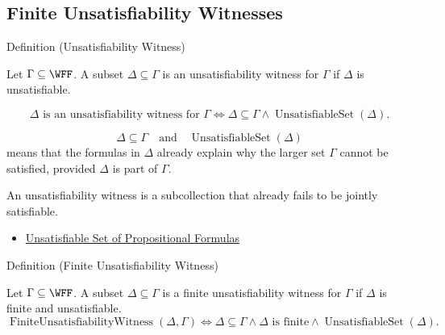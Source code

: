 \subsection*{Finite Unsatisfiability Witnesses}

\begin{definitionbox}{Definition (Unsatisfiability Witness)}
\begin{definition}
\label{def:unsatisfiability-witness-propositional-logic}
Let \(\Gamma\subseteq\WFF\). A subset \(\Delta\subseteq\Gamma\) is an
unsatisfiability witness for \(\Gamma\) if \(\Delta\) is unsatisfiable.
\end{definition}
\end{definitionbox}

\begin{remark*}
\[
\Delta\text{ is an unsatisfiability witness for }\Gamma
\Longleftrightarrow
\Delta\subseteq\Gamma\land \operatorname{UnsatisfiableSet}(\Delta).
\]
\end{remark*}

\begin{remark*}
\[
\Delta\subseteq\Gamma
\quad\text{and}\quad
\operatorname{UnsatisfiableSet}(\Delta)
\]
means that the formulas in \(\Delta\) already explain why the larger set
\(\Gamma\) cannot be satisfied, provided \(\Delta\) is part of \(\Gamma\).
\end{remark*}

\begin{remark*}[Interpretation]
An unsatisfiability witness is a subcollection that already fails to be
jointly satisfiable.
\end{remark*}

\begin{dependencies}
\begin{itemize}
  \item \hyperref[def:unsatisfiable-set-of-propositional-formulas]{Unsatisfiable Set of Propositional Formulas}
\end{itemize}
\end{dependencies}

\begin{definitionbox}{Definition (Finite Unsatisfiability Witness)}
\begin{definition}
\label{def:finite-unsatisfiability-witness-propositional-logic}
Let \(\Gamma\subseteq\WFF\). A subset \(\Delta\subseteq\Gamma\) is a finite
unsatisfiability witness for \(\Gamma\) if \(\Delta\) is finite and
unsatisfiable.
\[
\operatorname{FiniteUnsatisfiabilityWitness}(\Delta,\Gamma)
\Longleftrightarrow
\Delta\subseteq\Gamma\land \Delta\text{ is finite}\land
\operatorname{UnsatisfiableSet}(\Delta).
\]
\end{definition}
\end{definitionbox}

